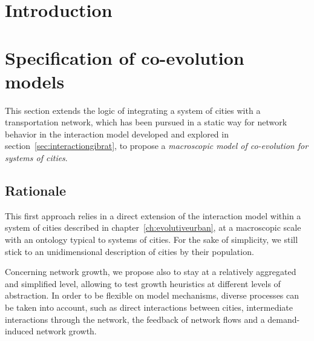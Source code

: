 








\section{Introduction}





\section{Specification of co-evolution models}

This section extends the logic of integrating a system of cities with a transportation network, which has been pursued in a static way for network behavior in the interaction model developed and explored in section~\ref{sec:interactiongibrat}, to propose a \emph{macroscopic model of co-evolution for systems of cities}.


\subsection{Rationale}

This first approach relies in a direct extension of the interaction model within a system of cities described in chapter~\ref{ch:evolutiveurban}, at a macroscopic scale with an ontology typical to systems of cities. For the sake of simplicity, we still stick to an unidimensional description of cities by their population.


Concerning network growth, we propose also to stay at a relatively aggregated and simplified level, allowing to test growth heuristics at different levels of abstraction. In order to be flexible on model mechanisms, diverse processes can be taken into account, such as direct interactions between cities, intermediate interactions through the network, the feedback of network flows and a demand-induced network growth.


